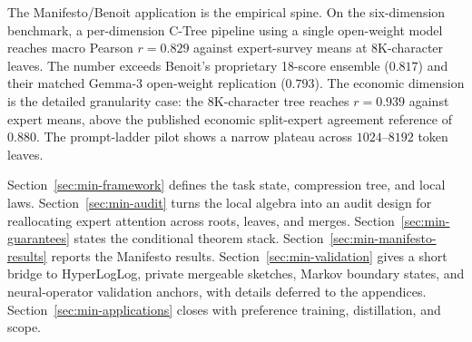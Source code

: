 The Manifesto/Benoit application is the empirical spine. On the six-dimension
benchmark, a per-dimension C-Tree pipeline using a single open-weight model
reaches macro Pearson $r=0.829$ against expert-survey means at
$8\mathrm{K}$-character leaves. The number exceeds Benoit's proprietary 18-score
ensemble ($0.817$) and their matched Gemma-3 open-weight replication
($0.793$). The economic dimension is the detailed granularity case: the
$8\mathrm{K}$-character tree reaches $r=0.939$ against expert means, above the
published economic split-expert agreement reference of $0.880$. The
prompt-ladder pilot shows a narrow plateau across $1024$--$8192$ token leaves.

Section~\ref{sec:min-framework} defines the task state, compression tree, and
local laws. Section~\ref{sec:min-audit} turns the local algebra into an audit
design for reallocating expert attention across roots, leaves, and merges.
Section~\ref{sec:min-guarantees} states the conditional theorem stack.
Section~\ref{sec:min-manifesto-results} reports the Manifesto results.
Section~\ref{sec:min-validation} gives a short bridge to HyperLogLog,
private mergeable sketches, Markov boundary states, and neural-operator
validation anchors, with details deferred to the appendices.
Section~\ref{sec:min-applications} closes with preference training,
distillation, and scope.
